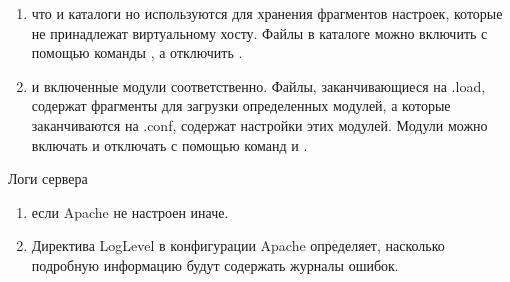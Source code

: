 \documentclass[a4paper,10pt,russian]{report}
\begin{document}
\begin{enumerate}
\begin{description}
\end{description}

\item {} \begin{description}
\sphinxAtStartPar
что и каталоги  но используются для хранения фрагментов настроек,
которые не принадлежат виртуальному хосту. Файлы в каталоге  можно включить
с помощью команды , а отключить \textendash{} .

\end{description}

\item {} \begin{description}
\sphinxAtStartPar
и включенные модули соответственно. Файлы, заканчивающиеся на .load, содержат фрагменты для
загрузки определенных модулей, а которые заканчиваются на .conf, содержат настройки этих модулей.
Модули можно включать и отключать с помощью команд  и .

\end{description}

\end{enumerate}

\sphinxAtStartPar
Логи сервера
\begin{enumerate}
%
\item {} \begin{description}
\sphinxAtStartPar
если Apache не настроен иначе.

\end{description}

\item {} \begin{description}
\sphinxAtStartPar
Директива LogLevel в конфигурации Apache определяет, насколько подробную информацию будут содержать журналы ошибок.

\end{description}

\end{enumerate}
\end{document}
